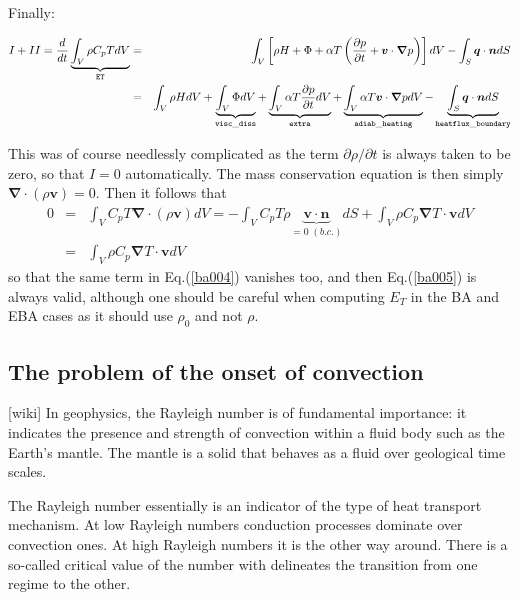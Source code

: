 Finally:

\begin{eqnarray}
I+II=\frac{d}{dt} \underbrace{\int_V \rho C_p T dV }_{\tt ET}
 &=& 
 \int_V \left[ 
 \rho H  + \Phi    +\alpha T \left( \frac{\partial p}{\partial t}+  \bm v \cdot {\bm \nabla} p \right) \right]  dV 
- \int_S  {\bm q} \cdot {\bm n}  dS \\ 
 &=& 
 \int_V \rho H dV 
+\underbrace{\int_V \Phi  dV}_{\tt visc\_diss}  
+\underbrace{\int_V \alpha T \frac{\partial p}{\partial t} dV}_{\tt extra}
+\underbrace{\int_V \alpha T \bm v \cdot {\bm \nabla} p  dV}_{\tt adiab\_heating} 
- \underbrace{\int_S  {\bm q} \cdot {\bm n}  dS}_{\tt heatflux\_boundary} \label{ba005}
\end{eqnarray}

This was of course needlessly complicated as the term $\partial \rho/\partial t$ is always 
taken to be zero, so that $I=0$ automatically. The mass conservation equation is then 
simply ${\bm \nabla}\cdot (\rho {\bm v})=0$. Then it follows that 
\begin{eqnarray}
0&=& \int_V C_p T {\bm \nabla} \cdot (\rho {\bm v}) dV
=
-\int_V C_p T \rho \underbrace{{\bm v} \cdot {\bm n}}_{=0 \; (b.c.)} dS +  \int_V \rho C_p  {\bm \nabla}  T \cdot {\bm v} dV \\
&=&  \int_V \rho C_p  {\bm \nabla}  T \cdot {\bm v} dV 
\end{eqnarray}
so that the same term in Eq.(\ref{ba004}) vanishes too, and then Eq.(\ref{ba005}) is always valid, although one should be careful when computing $E_T$ in the BA and EBA cases as it should use $\rho_0$ and not $\rho$.


\subsection*{The problem of the onset of convection}

[wiki] In geophysics, the Rayleigh number is of fundamental importance: it indicates the presence and strength of convection within a fluid body such as the Earth's mantle. The mantle is a solid that behaves as a fluid over geological time scales.

 The Rayleigh number essentially is an indicator of the type of heat transport mechanism. At low Rayleigh numbers conduction processes dominate over convection ones. At high Rayleigh numbers it is the other way around. There is a so-called critical value of the number with delineates the transition from one regime to the other. 

